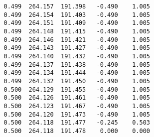 \begin{verbatim}
   0.499  264.157  191.398   -0.490    1.005
   0.499  264.154  191.403   -0.490    1.005
   0.499  264.151  191.409   -0.490    1.005
   0.499  264.148  191.415   -0.490    1.005
   0.499  264.146  191.421   -0.490    1.005
   0.499  264.143  191.427   -0.490    1.005
   0.499  264.140  191.432   -0.490    1.005
   0.499  264.137  191.438   -0.490    1.005
   0.499  264.134  191.444   -0.490    1.005
   0.499  264.132  191.450   -0.490    1.005
   0.500  264.129  191.455   -0.490    1.005
   0.500  264.126  191.461   -0.490    1.005
   0.500  264.123  191.467   -0.490    1.005
   0.500  264.120  191.473   -0.490    1.005
   0.500  264.118  191.477   -0.245    0.503
   0.500  264.118  191.478    0.000    0.000
\end{verbatim}
